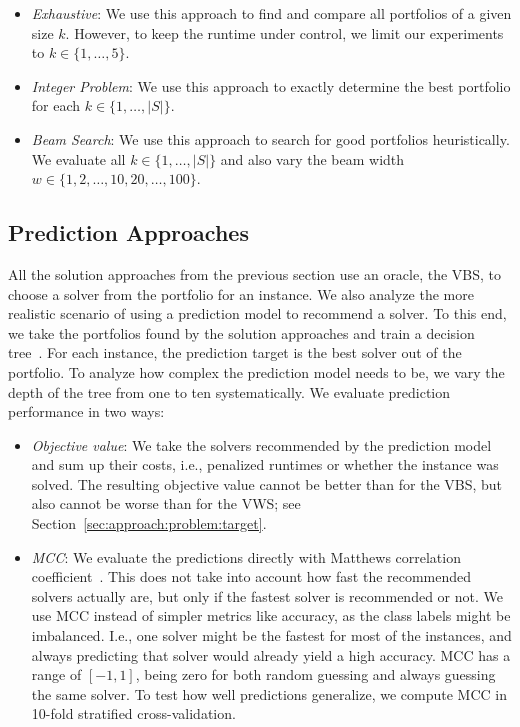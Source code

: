 \documentclass[conference]{IEEEtran}
\begin{document}
\begin{itemize}
	\item \emph{Exhaustive}:
	We use this approach to find and compare all portfolios of a given size $k$.
	However, to keep the runtime under control, we limit our experiments to $k \in \{1, \dots, 5\}$.
	\item \emph{Integer Problem}:
	We use this approach to exactly determine the best portfolio for each $k \in \{1, \dots, |S|\}$.
	\item \emph{Beam Search}:
	We use this approach to search for good portfolios heuristically.
	We evaluate all $k \in \{1, \dots, |S|\}$ and also vary the beam width $w \in \{1, 2, \dots, 10, 20, \dots, 100\}$.
\end{itemize}

\subsection{Prediction Approaches}

All the solution approaches from the previous section use an oracle, the VBS, to choose a solver from the portfolio for an instance.
We also analyze the more realistic scenario of using a prediction model to recommend a solver.
To this end, we take the portfolios found by the solution approaches and train a decision tree~\cite{breiman1984classification}.
For each instance, the prediction target is the best solver out of the portfolio.
To analyze how complex the prediction model needs to be, we vary the depth of the tree from one to ten systematically. %
We evaluate prediction performance in two ways:

\begin{itemize}
	\item \emph{Objective value}:
	We take the solvers recommended by the prediction model and sum up their costs, i.e., penalized runtimes or whether the instance was solved.
	The resulting objective value cannot be better than for the VBS, but also cannot be worse than for the VWS; see Section~\ref{sec:approach:problem:target}.
	\item \emph{MCC}:
	We evaluate the predictions directly with Matthews correlation coefficient~\cite{matthews1975comparison, gorodkin2004comparing}.
	This does not take into account how fast the recommended solvers actually are, but only if the fastest solver is recommended or not.
	We use MCC instead of simpler metrics like accuracy, as the class labels might be imbalanced.
	I.e., one solver might be the fastest for most of the instances, and always predicting that solver would already yield a high accuracy.
	MCC has a range of $[-1,1]$, being zero for both random guessing and always guessing the same solver.
	To test how well predictions generalize, we compute MCC in 10-fold stratified cross-validation.
\end{itemize}
\end{document}
